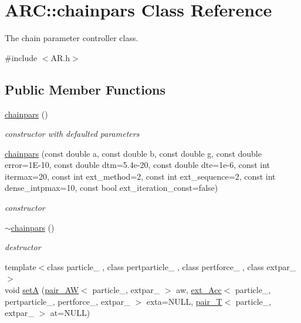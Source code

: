 \hypertarget{classARC_1_1chainpars}{}\section{A\+RC\+:\+:chainpars Class Reference}
\label{classARC_1_1chainpars}


The chain parameter controller class.  




{\ttfamily \#include $<$A\+R.\+h$>$}

\subsection*{Public Member Functions}
\begin{DoxyCompactItemize}
\item 
\hyperlink{classARC_1_1chainpars_a2019a609d85e2b801f306ac8c7f268ab}{chainpars} ()
\begin{DoxyCompactList}\small\item\em constructor with defaulted parameters \end{DoxyCompactList}\item 
\hyperlink{classARC_1_1chainpars_aa41e5cf2a9a8dea2c9c097cfd08d6120}{chainpars} (const double a, const double b, const double g, const double error=1\+E-\/10, const double dtm=5.\+4e-\/20, const double dte=1e-\/6, const int itermax=20, const int ext\+\_\+method=2, const int ext\+\_\+sequence=2, const int dense\+\_\+intpmax=10, const bool ext\+\_\+iteration\+\_\+const=false)
\begin{DoxyCompactList}\small\item\em constructor \end{DoxyCompactList}\item 
\hyperlink{classARC_1_1chainpars_a032873f782645efb6e60dc77f6d425dc}{$\sim$chainpars} ()
\begin{DoxyCompactList}\small\item\em destructor \end{DoxyCompactList}\item 
{\footnotesize template$<$class particle\+\_\+ , class pertparticle\+\_\+ , class pertforce\+\_\+ , class extpar\+\_\+ $>$ }\\void \hyperlink{classARC_1_1chainpars_ab66fadaa08cb449e1b49dd58e2d4b14f}{setA} (\hyperlink{namespaceARC_afc1f57a75859038cbd2492366fd1849c}{pair\+\_\+\+AW}$<$ particle\+\_\+, extpar\+\_\+ $>$ aw, \hyperlink{namespaceARC_aa423c7d6aff9481c040a20b3c5c6ff4e}{ext\+\_\+\+Acc}$<$ particle\+\_\+, pertparticle\+\_\+, pertforce\+\_\+, extpar\+\_\+ $>$ exta=N\+U\+LL, \hyperlink{namespaceARC_af6dbf77cf2968752315f7712eb2515a3}{pair\+\_\+T}$<$ particle\+\_\+, extpar\+\_\+ $>$ at=N\+U\+LL)

\end{DoxyCompactItemize}
